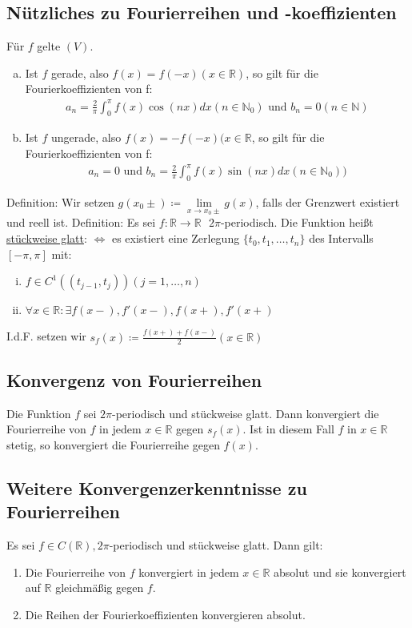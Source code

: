 \documentclass{article}
\begin{document}
\subsection{Nützliches zu Fourierreihen und -koeffizienten}
Für $f$ gelte $(V)$.
\begin{enumerate} [a)]
    \item Ist $f$ gerade, also $f(x) = f(-x) (x \in \mathbb{R})$, so gilt für die Fourierkoeffizienten von f:
    \begin{align*}
        a_n = \frac{2}{\pi} \int_0^{\pi} f(x) \cos(nx) dx (n \in \mathbb{N}_0) \text{ und } b_n=0 (n \in \mathbb{N})
    \end{align*}
    \item Ist $f$ ungerade, also $f(x) = -f(-x) (x \in \mathbb{R}$, so gilt für die Fourierkoeffizienten von f:
    \begin{align*}
        a_n = 0 \text{ und } b_n= \frac{2}{\pi} \int_0^{\pi} f(x) \sin(nx) dx (n \in \mathbb{N}_0))
    \end{align*}
\end{enumerate}
Definition: Wir setzen $g(x_0\pm) \coloneqq \lim \limits_{x \to x_0 \pm} g(x)$, falls der Grenzwert existiert und reell ist.
Definition: Es sei $f:\mathbb{R} \to \mathbb{R} \text{ } 2\pi$-periodisch. Die Funktion heißt \underline{stückweise glatt}: $\Leftrightarrow$ es existiert eine
Zerlegung $\{t_0,t_1,\ldots,t_n\}$ des Intervalls $[-\pi,\pi]$ mit:
\begin{enumerate}[i)]
    \item $f \in C^1((t_{j-1},t_j)) (j=1,\ldots,n)$
    \item $\forall x \in \mathbb{R}: \exists f(x-),f'(x-),f(x+),f'(x+)$
\end{enumerate}
I.d.F. setzen wir $s_f(x) \coloneqq \frac{f(x+) + f(x-)}{2} (x \in \mathbb{R})$

\subsection{Konvergenz von Fourierreihen}
Die Funktion $f$ sei $2\pi$-periodisch und stückweise glatt. Dann konvergiert die Fourierreihe von $f$ in jedem $x \in \mathbb{R}$ gegen $s_f(x)$. Ist in diesem
Fall $f$ in $x \in \mathbb{R}$ stetig, so konvergiert die Fourierreihe gegen $f(x)$.

\subsection{Weitere Konvergenzerkenntnisse zu Fourierreihen}
Es sei $f \in C(\mathbb{R}), 2\pi$-periodisch und stückweise glatt. Dann gilt:
\begin{enumerate}
    \item Die Fourierreihe von $f$ konvergiert in jedem $x \in \mathbb{R}$ absolut und sie konvergiert auf $\mathbb{R}$ gleichmäßig gegen $f$.
    \item Die Reihen der Fourierkoeffizienten konvergieren absolut.
\end{enumerate}
\end{document}
